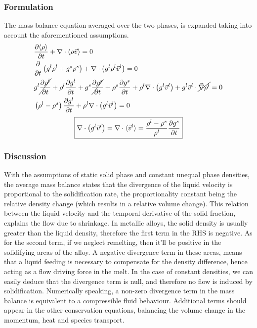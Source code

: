 \subsubsection{Formulation}
The mass balance equation averaged over the two phases, is expanded taking into account the aforementioned assumptions.
\begin{subequations}
\begin{align}
& \frac{\partial \langle \rho \rangle}{\partial t} + \nabla \cdot \langle \rho \vec{v} \rangle  = 0 \\ 
& \frac{\partial }{\partial t} \left(  {g^l} \rho^l + {g^s} \rho^s \right) + \nabla \cdot \left(  {g^l} \rho^l \vec{v}^l \right) = 0 \\ 
& {g^l} \cancel{\frac{\partial \rho^l }{\partial t}} + \rho^l \frac{\partial  {g^l} }{\partial t} 
	+ {g^s} \cancel{\frac{\partial \rho^s }{\partial t}} + \rho^s \frac{\partial  {g^s} }{\partial t} 
	+ \rho^l \nabla \cdot \left(  {g^l} \vec{v}^l \right) 
	+ {g^l} \vec{v}^l \cdot  \cancel{ \vec{\nabla} \rho^l }	 = 0 \\
& \left(  \rho^l - \rho^s  \right) \frac{\partial  {g^l} }{\partial t} + \rho^l \nabla \cdot \left(  {g^l} \vec{v}^l \right)  = 0
\end{align}
\end{subequations}
\begin{align}
\label{eq:mass_balance}
 \boxed{\nabla \cdot \left(  {g^l} \vec{v}^l \right) 
 	= \nabla \cdot \langle \vec{v}^l \rangle 
 	= \frac{\rho^l-\rho^s}{\rho^l} \frac{\partial  {g^s} }{\partial t}}
\end{align}
\subsubsection{Discussion}
With the assumptions of static solid phase and constant unequal phase densities, the average mass balance states that 
the divergence of the liquid velocity is proportional to the solidification rate, the proportionality constant being the
relative density change (which results in a relative volume change). This relation between the liquid velocity and the
temporal derivative of the solid fraction, explains the flow due to shrinkage. In metallic alloys, the solid density is
usually greater than the liquid density, therefore the first term in the RHS is negative. As for the second term, if we
neglect remelting, then it'll be positive in the solidifying areas of the alloy. A negative divergence term in these areas, 
means that a liquid feeding is necessary to compensate for the density difference, hence acting as a flow driving force in the melt.
In the case of constant densities, we can easily deduce that the divergence term is null, and therefore no flow is induced
by solidification.
\newline
Numerically speaking, a non-zero divergence term in the mass balance is equivalent to a compressible fluid behaviour. Additional 
terms should appear in the other conservation equations, balancing the volume change in the momentum, heat and species transport.

